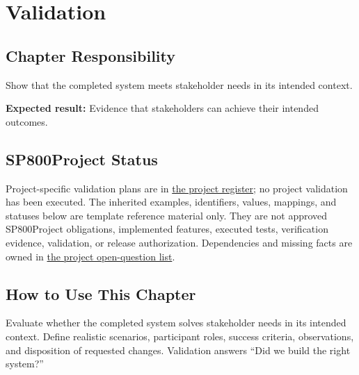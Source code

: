 \chapter{Validation}
\section{Chapter Responsibility}
\label{Section:ValidationResponsibility}
Show that the completed system meets stakeholder needs in its intended context.

\noindent\textbf{Expected result:} Evidence that stakeholders can achieve their intended outcomes.

\section{SP800Project Status}
\label{Section:SP800StatusValidation}
Project-specific validation plans are in \hyperref[Table:ProjectValidationRegister]{the project register}; no project validation has been executed. The inherited examples,
identifiers, values, mappings, and statuses below are template reference
material only. They are not approved SP800Project obligations, implemented features,
executed tests, verification evidence, validation, or release authorization.
Dependencies and missing facts are owned in
\hyperref[Section:SP800OpenQuestions]{the project open-question list}.

\section{How to Use This Chapter}
Evaluate whether the completed system solves stakeholder needs in its intended context. Define realistic scenarios, participant roles, success criteria, observations, and disposition of requested changes.
Validation answers ``Did we build the right system?''

